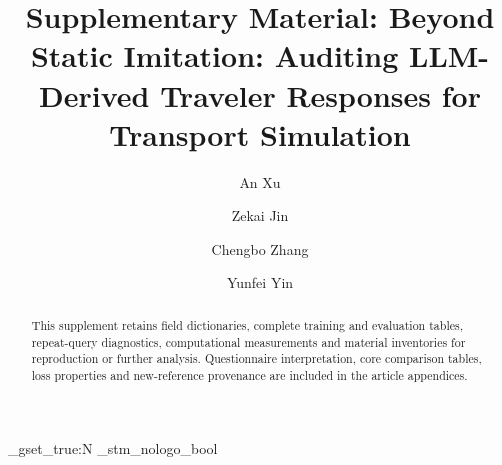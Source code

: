 \documentclass[a4paper,fleqn]{cas-sc}
\begin{document}
\ExplSyntaxOn
\bool_gset_true:N \g_stm_nologo_bool
\ExplSyntaxOff
\let\printorcid\relax
\let\WriteBookmarks\relax
\def\floatpagepagefraction{1}
\def\textpagefraction{.05}
\setcounter{topnumber}{4}
\setcounter{bottomnumber}{3}
\setcounter{totalnumber}{8}
\renewcommand{\topfraction}{0.92}
\renewcommand{\bottomfraction}{0.85}
\renewcommand{\textfraction}{0.08}
\renewcommand{\floatpagefraction}{0.75}


\title [mode = title]{Supplementary Material: Beyond Static Imitation: Auditing LLM-Derived Traveler Responses for Transport Simulation}

\author[1]{An Xu}

\author[2]{Zekai Jin}

\author[2]{Chengbo Zhang}

\author[1]{Yunfei Yin}
\cormark[1]

\address[1]{School of Transportation Science and Engineering, Harbin Institute of Technology, Harbin 150090, China}
\address[2]{Department of Civil Engineering, McGill University, Montreal, QC H3A 0C3, Canada}


\begin{abstract}
This supplement retains field dictionaries, complete training and evaluation tables, repeat-query diagnostics, computational measurements and material inventories for reproduction or further analysis. Questionnaire interpretation, core comparison tables, loss properties and new-reference provenance are included in the article appendices.
\end{abstract}
\maketitle







\end{document}
